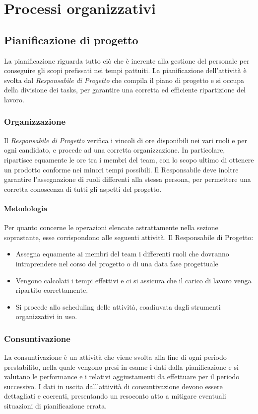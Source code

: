 \newpage

\section{Processi organizzativi}

	\subsection{Pianificazione di progetto}
	La pianificazione riguarda tutto ciò che è inerente alla gestione del personale per conseguire gli scopi prefissati nei tempi pattuiti. La pianificazione dell'attività è svolta dal \textit{Responsabile di Progetto} che compila il piano di progetto e si occupa della divisione dei tasks, per garantire una corretta ed efficiente ripartizione del lavoro.
		\subsubsection{Organizzazione}
		Il \textit{Responsabile di Progetto} verifica i vincoli di ore disponibili nei vari ruoli e per ogni candidato, e procede ad una corretta organizzazione. In particolare, ripartisce equamente le ore tra i membri del team, con lo scopo ultimo di ottenere un prodotto conforme nei minori tempi possibili. Il Responsabile deve inoltre garantire l'assegnazione di ruoli differenti alla stessa persona, per permettere una corretta conoscenza di tutti gli aspetti del progetto.
		
		\paragraph{Metodologia}
		Per quanto concerne le operazioni elencate astrattamente nella sezione soprastante, esse corrispondono alle seguenti attività. Il Responsabile di Progetto:
		\begin{itemize}
			\item Assegna equamente ai membri del team i differenti ruoli che dovranno intraprendere nel corso del progetto o di una data fase progettuale
			\item Vengono calcolati i tempi effettivi e ci si assicura che il carico di lavoro venga ripartito correttamente.
			\item Si procede allo scheduling delle attività, coadiuvata dagli strumenti organizzativi in uso.
		\end{itemize}
	
		\subsubsection{Consuntivazione}
		La consuntivazione è un attività che viene svolta alla fine di ogni periodo prestabilito, nella quale vengono presi in esame i dati dalla pianificazione e si valutano le performance e i relativi aggiustamenti da effettuare per il periodo successivo. I dati in uscita dall'attività di consuntivazione devono essere dettagliati e coerenti, presentando un resoconto atto a mitigare eventuali situazioni di pianificazione errata.
		
